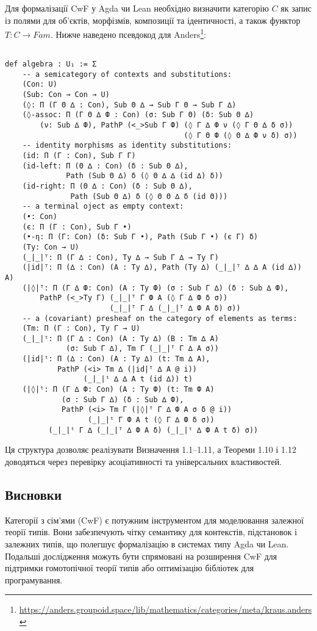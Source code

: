 \documentclass{article}
\theoremstyle{definition}
\begin{document}
Для формалізації CwF у Agda чи Lean необхідно визначити категорію $C$ як запис із полями
для об’єктів, морфізмів, композиції та ідентичності, а також функтор $T:C \rightarrow Fam$.
Нижче наведено псевдокод для Anders\footnote{\url{https://anders.groupoid.space/lib/mathematics/categories/meta/kraus.anders}}:

\begin{lstlisting}

def algebra : U₁ := Σ
    -- a semicategory of contexts and substitutions:
    (Con: U)
    (Sub: Con → Con → U)
    (◊: Π (Г Θ ∆ : Con), Sub Θ ∆ → Sub Г Θ → Sub Г ∆)
    (◊-assoc: Π (Г Θ ∆ Ф : Con) (σ: Sub Г Θ) (δ: Sub Θ ∆)
        (ν: Sub ∆ Ф), PathP (<_>Sub Г Ф) (◊ Г ∆ Ф ν (◊ Г Θ ∆ δ σ))
                                         (◊ Г Θ Ф (◊ Θ ∆ Ф ν δ) σ))
    -- identity morphisms as identity substitutions:
    (id: Π (Г : Con), Sub Г Г)
    (id-left: Π (Θ ∆ : Con) (δ : Sub Θ ∆),
              Path (Sub Θ ∆) δ (◊ Θ ∆ ∆ (id ∆) δ))
    (id-right: Π (Θ ∆ : Con) (δ : Sub Θ ∆),
               Path (Sub Θ ∆) δ (◊ Θ Θ ∆ δ (id Θ)))
    -- a terminal oject as empty context:
    (•: Con)
    (є: Π (Г : Con), Sub Г •)
    (•-η: Π (Г: Con) (δ: Sub Г •), Path (Sub Г •) (є Г) δ)
    (Ty: Con → U)
    (_|_|ᵀ: Π (Г ∆ : Con), Ty ∆ → Sub Г ∆ → Ty Г)
    (|id|ᵀ: Π (∆ : Con) (A : Ty ∆), Path (Ty ∆) (_|_|ᵀ ∆ ∆ A (id ∆)) A)
    (|◊|ᵀ: Π (Г ∆ Ф: Con) (A : Ty Ф) (σ : Sub Г ∆) (δ : Sub ∆ Ф),
        PathP (<_>Ty Г) (_|_|ᵀ Г Ф A (◊ Г ∆ Ф δ σ))
                        (_|_|ᵀ Г ∆ (_|_|ᵀ ∆ Ф A δ) σ))
    -- a (covariant) presheaf on the category of elements as terms:
    (Tm: Π (Г : Con), Ty Г → U)
    (_|_|ᵗ: Π (Г ∆ : Con) (A : Ty ∆) (B : Tm ∆ A)
              (σ: Sub Г ∆), Tm Г (_|_|ᵀ Г ∆ A σ))
    (|id|ᵗ: Π (∆ : Con) (A : Ty ∆) (t: Tm ∆ A),
            PathP (<i> Tm ∆ (|id|ᵀ ∆ A @ i))
                  (_|_|ᵗ ∆ ∆ A t (id ∆)) t)
    (|◊|ᵗ: Π (Г ∆ Ф: Con) (A : Ty Ф) (t: Tm Ф A)
             (σ : Sub Г ∆) (δ : Sub ∆ Ф),
             PathP (<i> Tm Г (|◊|ᵀ Г ∆ Ф A σ δ @ i))
                   (_|_|ᵗ Г Ф A t (◊ Г ∆ Ф δ σ))
          (_|_|ᵗ Г ∆ (_|_|ᵀ ∆ Ф A δ) (_|_|ᵗ ∆ Ф A t δ) σ))
\end{lstlisting}

Ця структура дозволяє реалізувати Визначення 1.1–1.11, а Теореми 1.10 і 1.12 доводяться через перевірку асоціативності та універсальних властивостей.

\newpage
\subsection{Висновки}

Категорії з сім’ями (CwF) є потужним інструментом для моделювання залежної теорії типів. Вони забезпечують чітку семантику для контекстів, підстановок і залежних типів, що полегшує формалізацію в системах типу Agda чи Lean. Подальші дослідження можуть бути спрямовані на розширення CwF для підтримки гомотопічної теорії типів або оптимізацію бібліотек для програмування.



\end{document}
